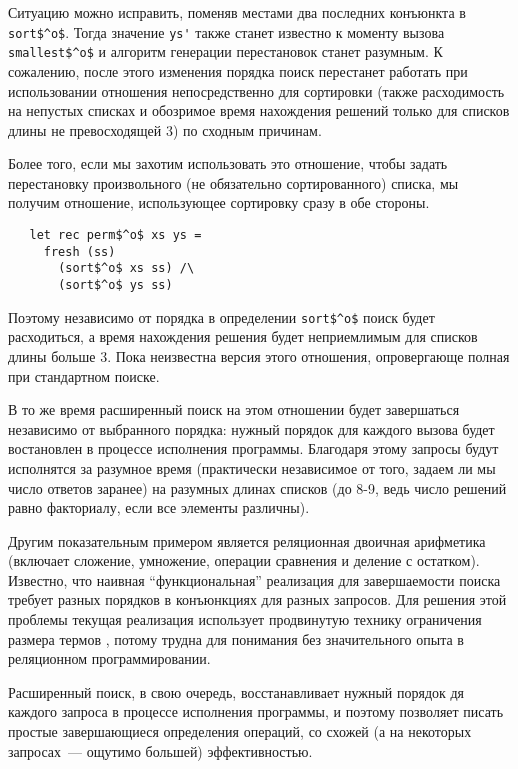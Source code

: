     Ситуацию можно исправить, поменяв местами два последних конъюнкта в \lstinline|sort$^o$|. Тогда значение \lstinline|ys'| также станет известно к моменту вызова \lstinline|smallest$^o$| и алгоритм генерации перестановок станет разумным. К сожалению, после этого изменения порядка поиск перестанет работать при использовании отношения непосредственно для сортировки (также расходимость на непустых списках и обозримое время нахождения решений только для списков длины не превосходящей $3$) по сходным причинам.
  
    Более того, если мы захотим использовать это отношение, чтобы задать перестановку произвольного (не обязательно сортированного) списка, мы получим отношение, использующее сортировку сразу в обе стороны.

\begin{lstlisting}
   let rec perm$^o$ xs ys =
     fresh (ss)
       (sort$^o$ xs ss) /\
       (sort$^o$ ys ss)
\end{lstlisting}

    Поэтому независимо от порядка в определении \lstinline|sort$^o$| поиск будет расходиться, а время нахождения решения будет неприемлимым для списков длины больше $3$. Пока неизвестна версия этого отношения, опровергающе полная при стандартном поиске.
  
    В то же время расширенный поиск на этом отношении будет завершаться независимо от выбранного порядка: нужный порядок для каждого вызова будет востановлен в процессе исполнения программы. Благодаря этому запросы будут исполнятся за разумное время (практически независимое от того, задаем ли мы число ответов заранее) на разумных длинах списков (до 8-9, ведь число решений равно факториалу, если все элементы различны).

    Другим показательным примером является реляционная двоичная арифметика (включает сложение, умножение, операции сравнения и деление с остатком). Известно, что наивная ``функциональная'' реализация для завершаемости поиска требует разных порядков в конъюнкциях для разных запросов. Для решения этой проблемы текущая реализация использует продвинутую технику ограничения размера термов \cite{KiselyovArithmetic}, потому трудна для понимания без значительного опыта в реляционном программировании.
    
    Расширенный поиск, в свою очередь, восстанавливает нужный порядок дя каждого запроса в процессе исполнения программы, и поэтому позволяет писать простые завершающиеся определения операций, со схожей (а на некоторых запросах~--- ощутимо большей) эффективностью.
    
